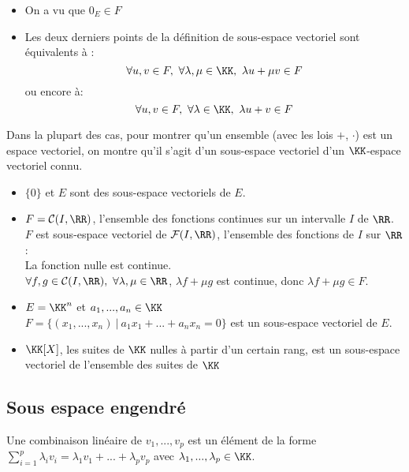 \documentclass[../main.tex]{subfile}
\begin{document}
\begin{rema}
\begin{itemize}	
	\item On a vu que $0_E \in F$
	\item Les deux derniers points de la définition de sous-espace vectoriel sont équivalents à :
	$$\forall u, v \in F, \ \forall \lambda, \mu \in \KK, \ \lambda u + \mu v \in F$$
	ou encore à:
	$$\forall u, v \in F, \ \forall \lambda \in \KK, \ \lambda u + v \in F$$
\end{itemize}
\end{rema}

\begin{rema}
	Dans la plupart des cas, pour montrer qu'un ensemble (avec les lois $+$, $\cdot$) est un espace vectoriel, on montre qu'il s'agit d'un sous-espace vectoriel d'un $\KK$-espace vectoriel connu.
\end{rema}

\begin{ex}
\begin{itemize}	
	\item $\{0\}$ et $E$ sont des sous-espace vectoriels de $E$.
	\item $F = \mathcal{C}(I, \RR)$, l'ensemble des fonctions continues sur un intervalle $I$ de $\RR$.\\
	$F$ est sous-espace vectoriel de $\mathcal{F}(I, \RR)$, l'ensemble des fonctions de $I$ sur $\RR$:\\
	La fonction nulle est continue.\\
	$\forall f, g \in \mathcal{C}(I, \RR), \ \forall \lambda, \mu \in \RR$, $\lambda f + \mu g$ est continue, donc $\lambda f + \mu g \in F$.
	\item $E = \KK^n$ et $a_1, ..., a_n \in \KK$\\
	$F = \{(x_1, ..., x_n) \ | \ a_1x_1 + ... + a_nx_n = 0\}$ est un sous-espace vectoriel de $E$.
	\item $\KK[X]$, les suites de $\KK$ nulles à partir d'un certain rang, est un sous-espace vectoriel de l'ensemble des suites de $\KK$
\end{itemize}
\end{ex}

\subsection{Sous espace engendré}
\begin{defi}
	Une combinaison linéaire de $v_1, ..., v_p$ est un élément de la forme $\sum\limits_{i=1}^p \lambda_i v_i = \lambda_1 v_1 + ... + \lambda_p v_p$ avec $\lambda_1, ..., \lambda_p \in \KK$.\\
\end{defi}
\end{document}
